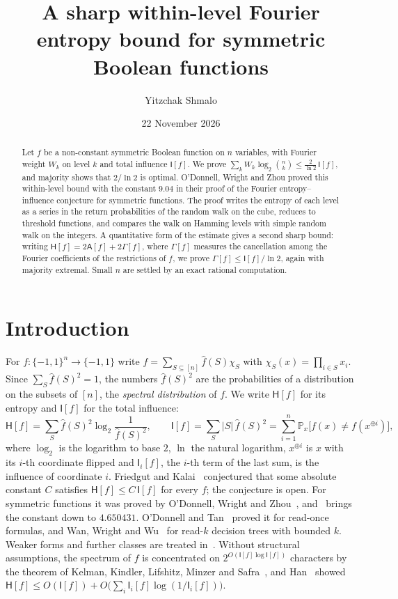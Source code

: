 \documentclass[11pt]{amsart}
\title{A sharp within-level Fourier entropy bound for symmetric Boolean functions}
\author{Yitzchak Shmalo}
\date{22 November 2026}
\theoremstyle{remark}
\newcommand{\bits}{\{-1,1\}}
\renewcommand{\P}{\mathbb P}
\newcommand{\HH}{\mathsf H}
\newcommand{\I}{\mathsf I}
\newcommand{\wh}[1]{\widehat{#1}}
\begin{document}
\begin{abstract}
Let $f$ be a non-constant symmetric Boolean function on $n$ variables, with Fourier weight $W_k$ on level $k$ and total influence $\I[f]$. We prove $\sum_k W_k\log_2\binom nk\le\frac2{\ln2}\,\I[f]$, and majority shows that $2/\ln 2$ is optimal. O'Donnell, Wright and Zhou proved this within-level bound with the constant $9.04$ in their proof of the Fourier entropy--influence conjecture for symmetric functions. The proof writes the entropy of each level as a series in the return probabilities of the random walk on the cube, reduces to threshold functions, and compares the walk on Hamming levels with simple random walk on the integers. A quantitative form of the estimate gives a second sharp bound: writing $\HH[f]=2\mathsf A[f]+2\Gamma[f]$, where $\Gamma[f]$ measures the cancellation among the Fourier coefficients of the restrictions of $f$, we prove $\Gamma[f]\le\I[f]/\ln2$, again with majority extremal. Small $n$ are settled by an exact rational computation.
\end{abstract}
\maketitle

\section{Introduction}

For $f:\bits^n\to\bits$ write $f=\sum_{S\subseteq[n]}\wh f(S)\chi_S$ with $\chi_S(x)=\prod_{i\in S}x_i$. Since $\sum_S\wh f(S)^2=1$, the numbers $\wh f(S)^2$ are the probabilities of a distribution on the subsets of $[n]$, the \emph{spectral distribution} of $f$. We write $\HH[f]$ for its entropy and $\I[f]$ for the total influence:
\[
 \HH[f]=\sum_{S}\wh f(S)^2\log_2\frac{1}{\wh f(S)^2},\qquad
 \I[f]=\sum_S|S|\,\wh f(S)^2=\sum_{i=1}^n\P_x\bigl[f(x)\ne f(x^{\oplus i})\bigr],
\]
where $\log_2$ is the logarithm to base $2$, $\ln$ the natural logarithm, $x^{\oplus i}$ is $x$ with its $i$-th coordinate flipped and $\I_i[f]$, the $i$-th term of the last sum, is the influence of coordinate $i$. Friedgut and Kalai~\cite{FK96} conjectured that some absolute constant $C$ satisfies $\HH[f]\le C\,\I[f]$ for every $f$; the conjecture is open. For symmetric functions it was proved by O'Donnell, Wright and Zhou~\cite{OWZ11}, and~\cite{Shm26b} brings the constant down to $4.650431$. O'Donnell and Tan~\cite{OT13} proved it for read-once formulas, and Wan, Wright and Wu~\cite{WWW14} for read-$k$ decision trees with bounded $k$. Weaker forms and further classes are treated in~\cite{KMS12,CKLS16,ACKSW21,GMP26}. Without structural assumptions, the spectrum of $f$ is concentrated on $2^{O(\I[f]\log\I[f])}$ characters by the theorem of Kelman, Kindler, Lifshitz, Minzer and Safra~\cite{KKLMS20}, and Han~\cite{Han25} showed $\HH[f]\le O(\I[f])+O\bigl(\sum_i\I_i[f]\log(1/\I_i[f])\bigr)$.
\end{document}
